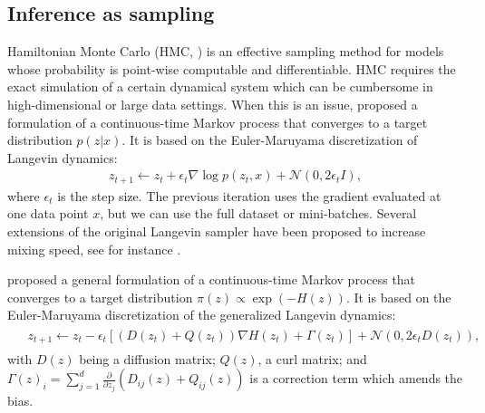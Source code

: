 \subsection{Inference as sampling}\label{sec:infassamp}

Hamiltonian Monte Carlo (HMC, \cite{neal2011mcmc}) is an effective sampling method for models whose probability is point-wise computable and differentiable. %
HMC requires the exact simulation of a certain dynamical system which can be cumbersome in high-dimensional or large data settings. When this is an issue, \cite{welling2011bayesian} proposed a formulation of a continuous-time Markov process that converges to a target distribution $p({z} | {x})$. It is based on the Euler-Maruyama discretization of Langevin dynamics:
\begin{eqnarray}\label{eq:sgld}
{z}_{t+1} \leftarrow {z}_{t} + \epsilon_t \nabla \log p({z}_t,{x})  + \mathcal{N}({0}, 2\epsilon_t I),
\end{eqnarray}
where $\epsilon_t$ is the step size. The previous iteration uses the gradient evaluated at one data point ${x}$, but we can use the full dataset or mini-batches. Several extensions of the original Langevin sampler have been proposed to increase mixing speed, see for instance \cite{li2016preconditioned,li2016high,li2019communication}.

\cite{ma2015complete} proposed a general formulation of a continuous-time Markov process that converges to a target distribution $\pi({z}) \propto \exp (-H({z}))$. It is based on the Euler-Maruyama discretization of the generalized Langevin dynamics:
\begin{align}\label{eq:sgmcmc}
\begin{split}
&{z}_{t+1} \leftarrow {z}_{t}  -\epsilon_t \left[ ({D}({z}_t) + {Q}({z}_t)) \nabla H({z}_t) + {\Gamma}({z}_t) \right] + \mathcal{N}({0}, 2\epsilon_t {D}({z}_t)),
\end{split}
\end{align}
with ${D}({z})$ being a diffusion matrix; ${Q}({z})$, a curl matrix; and ${\Gamma}({z})_i = \sum_{j=1}^d \frac{\partial}{\partial {z}_j} ({D}_{ij}({z}) + {Q}_{ij}({z})) $ is a correction term which amends the bias.

